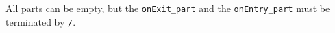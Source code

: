 All parts can be empty, but the
{\tt onExit\_part} and 
the {\tt onEntry\_part} must be terminated by {\tt /}.